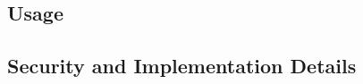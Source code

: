 \documentclass{article}
\begin{document}
\subsection{Usage}



\subsection{Security and Implementation Details}
















\end{document}
